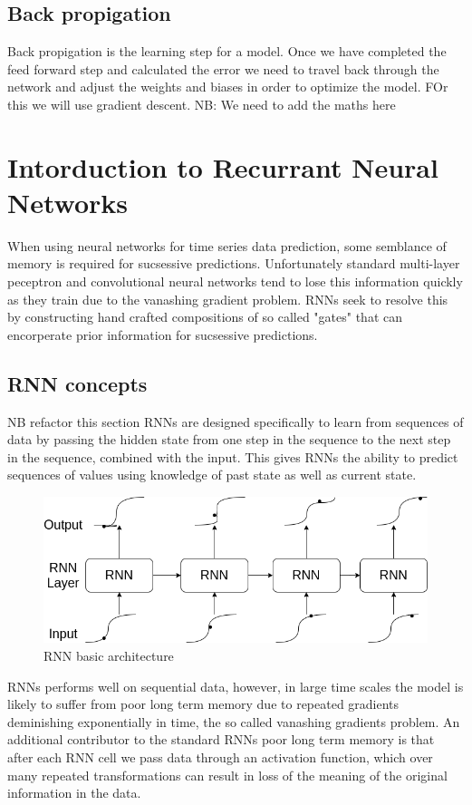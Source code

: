 \documentclass{article}
\begin{document}
\subsection{Back propigation}
\label{sec:back}
Back propigation is the learning step for a model. Once we have completed the feed forward step and calculated the error we need to travel back through the network and adjust the weights and biases in order to optimize the model. FOr this we will use gradient descent.
NB: We need to add the maths here 

\section{Intorduction to Recurrant Neural Networks}
\label{sec:intoRNNs}
When using neural networks for time series data prediction, some semblance of memory is required for sucsessive predictions. Unfortunately standard multi-layer peceptron and convolutional neural networks tend to lose this information quickly as they train due to the vanashing gradient problem. RNNs seek to resolve this by constructing hand crafted compositions of so called "gates" that can encorperate prior information for sucsessive predictions. 

\subsection{RNN concepts}
\label{sec:RNNS}
NB refactor this section
RNNs are designed specifically to learn from sequences of data by passing the hidden state from one step in the sequence to the next step in the sequence, combined with the input. This gives RNNs the ability to predict sequences of values using knowledge of past state as well as current state. 
\begin{figure}[H]
\caption{RNN basic architecture}
\label{fig:RNN}
\includegraphics[scale=0.5]{RNN.png}
\end{figure}
RNNs performs well on sequential data, however, in large time scales the model is likely to suffer from poor long term memory due to repeated gradients deminishing exponentially in time, the so called vanashing gradients problem. An additional contributor to the standard RNNs poor long term memory is that after each RNN cell we pass data through an activation function, which over many repeated transformations can result in loss of the meaning of the original information in the data. 
\end{document}
